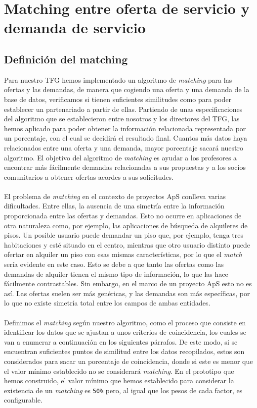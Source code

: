 \documentclass[11pt]{book}
\begin{document}
\chapter{Matching entre oferta de servicio y demanda de servicio}\label{cap:matching}
\section{Definición del matching }
Para nuestro TFG hemos implementado un algoritmo de \emph{matching} para las ofertas y las demandas, de manera que cogiendo una oferta y una demanda de la base de datos, verificamos si tienen suficientes similitudes como para poder establecer un partenariado a partir de ellas. Partiendo de unas especificaciones del algoritmo que se establecieron entre nosotros y los directores del TFG, las hemos aplicado para poder obtener la información relacionada representada por un porcentaje, con el cual se decidirá el resultado final.  Cuantos más datos haya relacionados entre una oferta y una demanda, mayor porcentaje sacará nuestro algoritmo. El objetivo del algoritmo de \emph{matching} es ayudar a los profesores a encontrar más fácilmente demandas relacionadas a sus propuestas y a los socios comunitarios a obtener ofertas acordes a sus solicitudes. \\\\
El problema de \emph{matching} en el contexto de proyectos ApS conlleva varias dificultades. Entre ellas, la ausencia de una simetría entre la información proporcionada entre las ofertas y demandas. Esto no ocurre en aplicaciones de otra naturaleza como, por ejemplo, las aplicaciones de búsqueda de alquileres de pisos. Un posible usuario puede demandar un piso que, por ejemplo, tenga tres habitaciones y esté situado en el centro, mientras que otro usuario distinto puede ofertar en alquiler un piso con esas mismas características, por lo que el \emph{match} sería evidente en este caso. Esto se debe a que tanto las ofertas como las demandas de alquiler tienen el mismo tipo de información, lo que las hace fácilmente contrastables. Sin embargo, en el marco de un proyecto ApS esto no es así. Las ofertas suelen ser más genéricas, y las demandas son más específicas, por lo que no existe simetría total entre los campos de ambas entidades.\\\\
Definimos el \emph{matching} según nuestro algoritmo, como el proceso que consiste en identificar los datos que se ajustan a unos criterios de coincidencia, los cuales se van a enumerar a continuación en los siguientes párrafos. De este modo, si se encuentran suficientes puntos de similitud entre los datos recopilados, estos son considerados para sacar un porcentaje de coincidencia, donde si este es menor que el valor mínimo establecido no se considerará \emph{matching}. En el prototipo que hemos construido, el valor mínimo que hemos
establecido para considerar la existencia de un \emph{matching} es \texttt{50\%} pero, al
igual que los pesos de cada factor, es configurable.
\\\\
\end{document}
